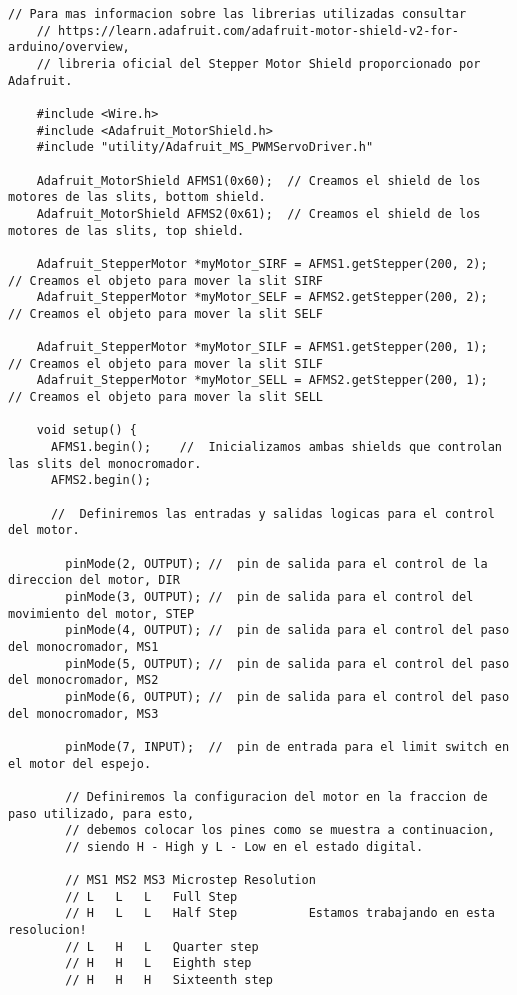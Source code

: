 \begin{lstlisting}[style=Arduino]
    // Para mas informacion sobre las librerias utilizadas consultar 
    // https://learn.adafruit.com/adafruit-motor-shield-v2-for-arduino/overview, 
    // libreria oficial del Stepper Motor Shield proporcionado por Adafruit.
    
    #include <Wire.h>
    #include <Adafruit_MotorShield.h>
    #include "utility/Adafruit_MS_PWMServoDriver.h"
    
    Adafruit_MotorShield AFMS1(0x60);  // Creamos el shield de los motores de las slits, bottom shield.
    Adafruit_MotorShield AFMS2(0x61);  // Creamos el shield de los motores de las slits, top shield.
    
    Adafruit_StepperMotor *myMotor_SIRF = AFMS1.getStepper(200, 2);   // Creamos el objeto para mover la slit SIRF
    Adafruit_StepperMotor *myMotor_SELF = AFMS2.getStepper(200, 2);   // Creamos el objeto para mover la slit SELF
    
    Adafruit_StepperMotor *myMotor_SILF = AFMS1.getStepper(200, 1);   // Creamos el objeto para mover la slit SILF
    Adafruit_StepperMotor *myMotor_SELL = AFMS2.getStepper(200, 1);   // Creamos el objeto para mover la slit SELL
    
    void setup() {
      AFMS1.begin();    //  Inicializamos ambas shields que controlan las slits del monocromador.
      AFMS2.begin();  
      
      //  Definiremos las entradas y salidas logicas para el control del motor.
    
        pinMode(2, OUTPUT); //  pin de salida para el control de la direccion del motor, DIR
        pinMode(3, OUTPUT); //  pin de salida para el control del movimiento del motor, STEP 
        pinMode(4, OUTPUT); //  pin de salida para el control del paso del monocromador, MS1
        pinMode(5, OUTPUT); //  pin de salida para el control del paso del monocromador, MS2
        pinMode(6, OUTPUT); //  pin de salida para el control del paso del monocromador, MS3
    
        pinMode(7, INPUT);  //  pin de entrada para el limit switch en el motor del espejo.
    
        // Definiremos la configuracion del motor en la fraccion de paso utilizado, para esto,
        // debemos colocar los pines como se muestra a continuacion,
        // siendo H - High y L - Low en el estado digital.
    
        // MS1 MS2 MS3 Microstep Resolution
        // L   L   L   Full Step
        // H   L   L   Half Step          Estamos trabajando en esta resolucion!
        // L   H   L   Quarter step
        // H   H   L   Eighth step
        // H   H   H   Sixteenth step
    

\end{lstlisting}

